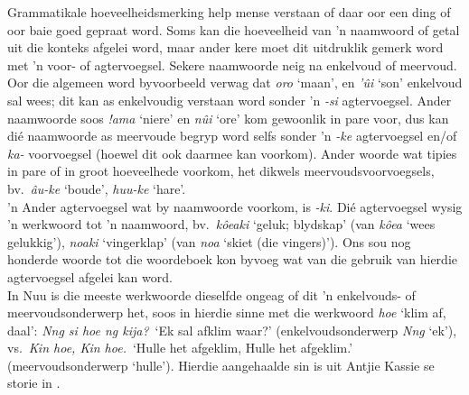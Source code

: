 Grammatikale hoeveelheidsmerking help mense verstaan of daar oor een
ding of oor baie goed gepraat word. Soms kan die hoeveelheid van 'n
naamwoord of getal uit die konteks afgelei word, maar ander kere moet
dit uitdruklik gemerk word met 'n voor- of agtervoegsel. Sekere
naamwoorde neig na enkelvoud of meervoud. Oor die algemeen word
byvoorbeeld verwag dat \emph{\textipa{\textdoublebarpipe}oro} `maan',
en \emph{\textipa{\textdoublevertline}'\^{u}i} `son' enkelvoud sal
wees; dit kan as enkelvoudig verstaan word sonder 'n \emph{-si}
agtervoegsel. Ander naamwoorde soos \emph{!ama} `niere' en
\emph{n\textipa{\textdoublebarpipe}\^{u}i} `ore' kom gewoonlik in pare
voor, dus kan di\'{e} naamwoorde as meervoude begryp word selfs sonder
'n \emph{-ke} agtervoegsel en/of \emph{ka-} voorvoegsel (hoewel dit
ook daarmee kan voorkom). Ander woorde wat tipies in pare of in groot
hoeveelhede voorkom, het dikwels meervoudsvoorvoegsels, bv.\
\emph{\textipa{\textdoublebarpipe}\^{a}u-ke} `boude',
\emph{\textipa{\textvertline}huu-ke} `hare'.\\

'n Ander agtervoegsel wat by naamwoorde voorkom, is \emph{-ki}.
Di\'{e} agtervoegsel wysig 'n werkwoord tot 'n naamwoord, bv.\
\emph{k\^{o}eaki} `geluk; blydskap' (van \emph{k\^{o}ea} `wees
gelukkig'), \emph{n\textipa{\textdoublebarpipe}oaki} `vingerklap' (van
\emph{n\textipa{\textdoublebarpipe}oa} `skiet (die vingers)'). Ons sou
nog honderde woorde tot die woordeboek kon byvoeg wat van die gebruik
van hierdie agtervoegsel afgelei kan word.\\

In N\textipa{\textvertline}uu is die meeste werkwoorde dieselfde
ongeag of dit 'n enkelvouds- of meervoudsonderwerp het, soos in
hierdie sinne met die werkwoord
\emph{\textipa{\textdoublevertline}hoe} `klim af, daal':
\emph{N\textipa{\textvertline}ng si \textipa{\textdoublevertline}hoe
ng kija?}\ `Ek sal afklim waar?' (enkelvoudsonderwerp
\emph{N\textipa{\textvertline}ng} `ek'), vs.\ \emph{Kin
\textipa{\textdoublevertline}hoe, Kin
\textipa{\textdoublevertline}hoe.}\ `Hulle het afgeklim, Hulle het
afgeklim.' (meervoudsonderwerp `hulle'). Hierdie aangehaalde sin is
uit Antjie Kassie se storie in \textcite{Collins2011}.\\

